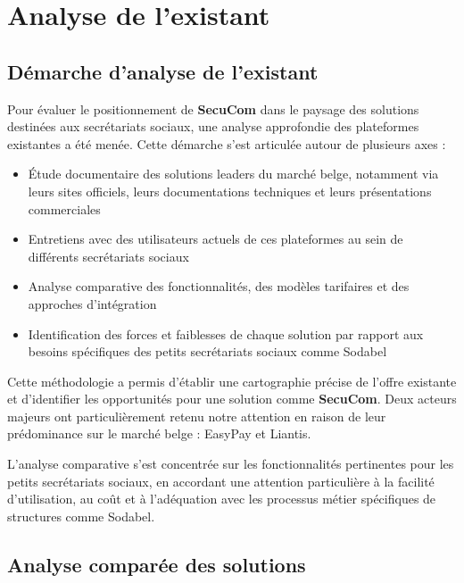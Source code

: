 \chapter{Analyse de l'existant}

\section{Démarche d'analyse de l'existant}

\noindent Pour évaluer le positionnement de \textbf{SecuCom} dans le paysage des solutions destinées aux secrétariats sociaux, une analyse approfondie des plateformes existantes a été menée. Cette démarche s'est articulée autour de plusieurs axes :

\begin{itemize}[leftmargin=*,label=\textcolor{darkgray}{$\bullet$},itemsep=0.3em]
  \item Étude documentaire des solutions leaders du marché belge, notamment via leurs sites officiels, leurs documentations techniques et leurs présentations commerciales
  \item Entretiens avec des utilisateurs actuels de ces plateformes au sein de différents secrétariats sociaux
  \item Analyse comparative des fonctionnalités, des modèles tarifaires et des approches d'intégration
  \item Identification des forces et faiblesses de chaque solution par rapport aux besoins spécifiques des petits secrétariats sociaux comme Sodabel
\end{itemize}

\vspace{0.5cm}

\noindent Cette méthodologie a permis d'établir une cartographie précise de l'offre existante et d'identifier les opportunités pour une solution comme \textbf{SecuCom}. Deux acteurs majeurs ont particulièrement retenu notre attention en raison de leur prédominance sur le marché belge : EasyPay et Liantis.

\begin{note}
L'analyse comparative s'est concentrée sur les fonctionnalités pertinentes pour les petits secrétariats sociaux, en accordant une attention particulière à la facilité d'utilisation, au coût et à l'adéquation avec les processus métier spécifiques de structures comme Sodabel.
\end{note}
\newpage

\section{Analyse comparée des solutions}

